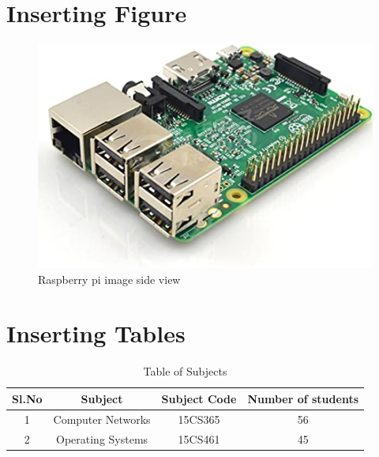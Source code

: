 \documentclass[10pt,a4paper,final,conference]{IEEEtran}
\begin{document}
\section{Inserting Figure}
\begin{figure}[h]
	\centering
	\includegraphics[width=0.5\linewidth,height=0.3\linewidth]{pi}
	\caption{Raspberry pi image side view}
	\label{fig:pi}
\end{figure}


\section{Inserting Tables}
\begin{table}[h]
\centering
\caption{Table of Subjects}
\begin{tabular}{|c|c|c|c|}
\hline
Sl.No & Subject & Subject Code & Number of students\\
\hline
1 & Computer Networks & 15CS365 & 56\\
\hline
2 & Operating Systems & 15CS461 & 45\\
\hline
\end{tabular}
\label{table:Subject}
\end{table}
\end{document}
